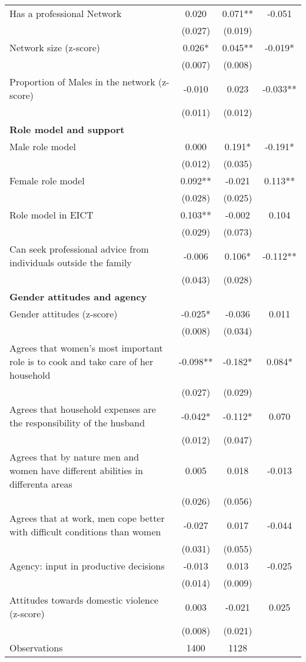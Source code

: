\begin{longtable}{m{9cm}ccc}
Has a professional Network&0.020&0.071**&   -0.051\\
&(0.027)&(0.019)&\\
Network size (z-score)&0.026*&0.045**&   -0.019*\\
&(0.007)&(0.008)&\\
Proportion of Males in the network (z-score) &-0.010&0.023&   -0.033**\\
&(0.011)&(0.012)&\\
\textbf{Role model and support}&&&\\
Male role model&0.000&0.191*&   -0.191*\\
&(0.012)&(0.035)&\\
Female role model&0.092**&-0.021&    0.113**\\
&(0.028)&(0.025)&\\
Role model in EICT&0.103**&-0.002&    0.104\\
&(0.029)&(0.073)&\\
Can seek professional advice from individuals outside the family &-0.006&0.106*&   -0.112**\\
&(0.043)&(0.028)&\\
\textbf{Gender attitudes and agency}&&&\\
Gender attitudes (z-score)&-0.025*&-0.036&    0.011\\
&(0.008)&(0.034)&\\
Agrees that women’s most important role is to cook and take care of her household &-0.098**&-0.182*&    0.084*\\
&(0.027)&(0.029)&\\
Agrees that household expenses are the responsibility of the husband&-0.042*&-0.112*&    0.070\\
&(0.012)&(0.047)&\\
Agrees that by nature men and women have different abilities in differenta areas&0.005&0.018&   -0.013\\
&(0.026)&(0.056)&\\
Agrees that at work, men cope better with difficult conditions than women&-0.027&0.017&   -0.044\\
&(0.031)&(0.055)&\\
Agency: input in productive decisions&-0.013&0.013&   -0.025\\
&(0.014)&(0.009)&\\
Attitudes towards domestic violence (z-score) &0.003&-0.021&    0.025\\
&(0.008)&(0.021)&\\
Observations&1400&1128&\\

\end{longtable}
